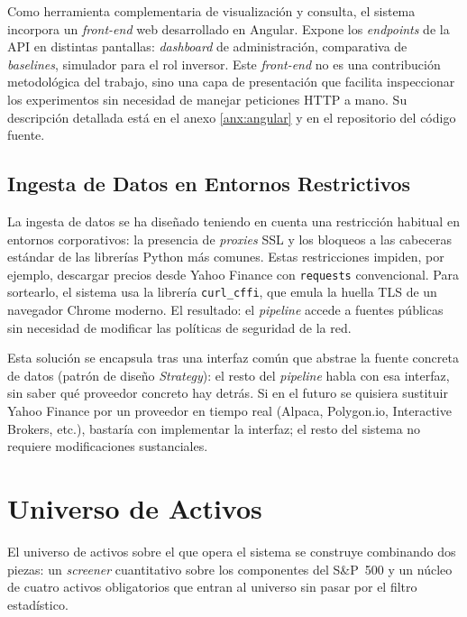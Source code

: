 \documentclass[IB,a4paper]{TFUOC}
\begin{document}
Como herramienta complementaria de visualización y consulta, el sistema incorpora un \textit{front-end} web desarrollado en Angular. Expone los \textit{endpoints} de la API en distintas pantallas: \textit{dashboard} de administración, comparativa de \textit{baselines}, simulador para el rol inversor. Este \textit{front-end} no es una contribución metodológica del trabajo, sino una capa de presentación que facilita inspeccionar los experimentos sin necesidad de manejar peticiones HTTP a mano. Su descripción detallada está en el anexo \ref{anx:angular} y en el repositorio del código fuente.

\subsection{Ingesta de Datos en Entornos Restrictivos}

La ingesta de datos se ha diseñado teniendo en cuenta una restricción habitual en entornos corporativos: la presencia de \textit{proxies} SSL y los bloqueos a las cabeceras estándar de las librerías Python más comunes. Estas restricciones impiden, por ejemplo, descargar precios desde Yahoo Finance con \texttt{requests} convencional. Para sortearlo, el sistema usa la librería \texttt{curl\_cffi}, que emula la huella TLS de un navegador Chrome moderno. El resultado: el \textit{pipeline} accede a fuentes públicas sin necesidad de modificar las políticas de seguridad de la red.

Esta solución se encapsula tras una interfaz común que abstrae la fuente concreta de datos (patrón de diseño \textit{Strategy}): el resto del \textit{pipeline} habla con esa interfaz, sin saber qué proveedor concreto hay detrás. Si en el futuro se quisiera sustituir Yahoo Finance por un proveedor en tiempo real (Alpaca, Polygon.io, Interactive Brokers, etc.), bastaría con implementar la interfaz; el resto del sistema no requiere modificaciones sustanciales.

\section{Universo de Activos}
\label{sec:universo}

El universo de activos sobre el que opera el sistema se construye combinando dos piezas: un \textit{screener} cuantitativo sobre los componentes del S\&P~500 y un núcleo de cuatro activos obligatorios que entran al universo sin pasar por el filtro estadístico.
\end{document}
